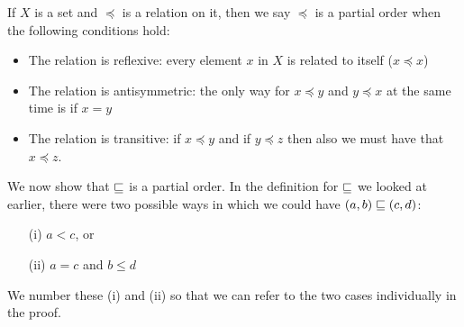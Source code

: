If $X$ is a set and $\preceq$ is a relation on it, then we say $\preceq$ is a partial order when the following conditions hold:
\begin{itemize}
\item The relation is reflexive: every element $x$ in $X$ is related to itself ($x \preceq x$)	
\item The relation is antisymmetric: the only way for $x \preceq y$ and $y \preceq x$ at the same time is if $x = y$
\item The relation is transitive: if $x \preceq y$ and if $y \preceq z$ then also we must have that $x \preceq z$.
\end{itemize}
We now show that $\sqsubseteq$ is a partial order.
In the definition for $\sqsubseteq$ we looked at earlier, there were two possible ways in which we could have $(a, b) \sqsubseteq (c, d)$:
\begin{enumerate}
	\item[(i)] $a < c$, or
	\item[(ii)] $a = c$ and $b \leq d$
\end{enumerate}
We number these (i) and (ii) so that we can refer to the two cases individually in the proof.

